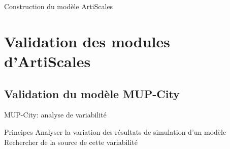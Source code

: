 \documentclass[xcolor=table]{beamer}
\begin{document}
\begin{frame}{Construction du modèle ArtiScales}
\end{frame}

\section{Validation des modules d'ArtiScales}

\subsection{Validation du modèle MUP-City}

\begin{frame}
\subsectionpage
\end{frame}

\begin{frame}{MUP-City: analyse de variabilité}
	\begin{block}{Principes}
				Analyser la variation des résultats de simulation d'un modèle\\
				Rechercher de la source de cette variabilité
		\end{block}

\end{frame}
\end{document}
